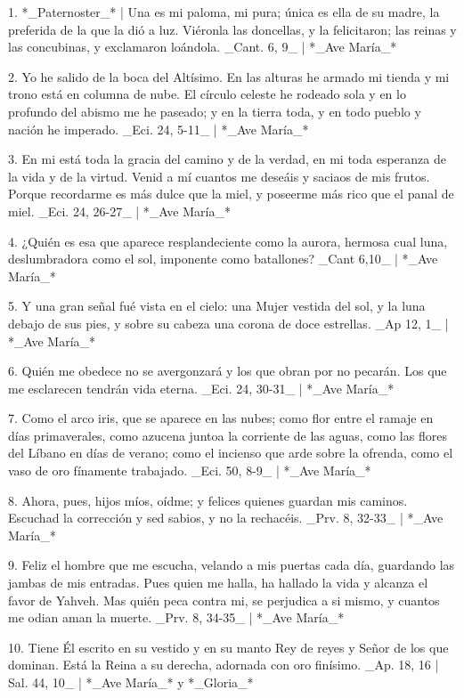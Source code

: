1. *_Paternoster_* | Una es mi paloma, mi pura; única es ella de su madre, la preferida de la que la dió a luz. Viéronla las doncellas, y la felicitaron; las reinas y las concubinas, y exclamaron loándola. _Cant. 6, 9_ | *_Ave María_*

2. Yo he salido de la boca del Altísimo. En las alturas he armado mi tienda y mi trono está en columna de nube. El círculo celeste he rodeado sola y en lo profundo del abismo me he paseado; y en la tierra toda, y en todo pueblo y nación he imperado. _Eci. 24, 5-11_ | *_Ave María_*

3. En mi está toda la gracia del camino y de la verdad, en mi toda esperanza de la vida y de la virtud. Venid a mí cuantos me deseáis y saciaos de mis frutos. Porque recordarme es más dulce que la miel, y poseerme más rico que el panal de miel. _Eci. 24, 26-27_ | *_Ave María_*

4. ¿Quién es esa que aparece resplandeciente como la aurora, hermosa cual luna, deslumbradora como el sol, imponente como batallones? _Cant 6,10_ | *_Ave María_*

5. Y una gran señal fué vista en el cielo: una Mujer vestida del sol, y la luna debajo de sus pies, y sobre su cabeza una corona de doce estrellas. _Ap 12, 1_ | *_Ave María_*

6. Quién me obedece no se avergonzará y los que obran por no pecarán. Los que me esclarecen tendrán vida eterna. _Eci. 24, 30-31_ | *_Ave María_*

7. Como el arco iris, que se aparece en las nubes; como flor entre el ramaje en días primaverales, como azucena juntoa la corriente de las aguas, como las flores del Líbano en días de verano; como el incienso que arde sobre la ofrenda, como el vaso de oro fínamente trabajado. _Eci. 50, 8-9_ | *_Ave María_*

8. Ahora, pues, hijos míos, oídme; y felices quienes guardan mis caminos. Escuchad la corrección y sed sabios, y no la rechacéis. _Prv. 8, 32-33_ | *_Ave María_*

9. Feliz el hombre que me escucha, velando a mis puertas cada día, guardando las jambas de mis entradas. Pues quien me halla, ha hallado la vida y alcanza el favor de Yahveh. Mas quién peca contra mi, se perjudica a si mismo, y cuantos me odian aman la muerte. _Prv. 8, 34-35_ | *_Ave María_*

10. Tiene Él escrito en su vestido y en su manto Rey de reyes y Señor de los que dominan. Está la Reina a su derecha, adornada con oro finísimo. _Ap. 18, 16 | Sal. 44, 10_ | *_Ave María_* y *_Gloria_*